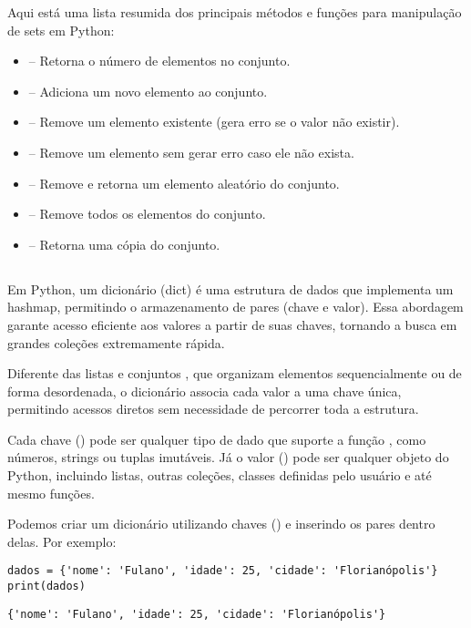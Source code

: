 Aqui está uma lista resumida dos principais métodos e funções para manipulação de sets em Python:
\begin{itemize}
\item {} – Retorna o número de elementos no conjunto.
\item {} – Adiciona um novo elemento ao conjunto.
\item {} – Remove um elemento existente (gera erro se o valor não existir).
\item {} – Remove um elemento sem gerar erro caso ele não exista.
\item {} – Remove e retorna um elemento aleatório do conjunto.
\item {} – Remove todos os elementos do conjunto.
\item {} – Retorna uma cópia do conjunto.
\end{itemize}


\subsection{}

Em Python, um dicionário (dict) é uma estrutura de dados que implementa um hashmap, permitindo o armazenamento de pares
 (chave e valor).
Essa abordagem garante acesso eficiente aos valores a partir de suas chaves, tornando a busca em grandes coleções
extremamente rápida.

Diferente das listas  e conjuntos , que organizam elementos sequencialmente ou de forma desordenada,
o dicionário associa cada valor a uma chave única, permitindo acessos diretos sem necessidade de percorrer toda a
estrutura.

Cada chave () pode ser qualquer tipo de dado que suporte a função , como números, strings
ou tuplas imutáveis.
Já o valor () pode ser qualquer objeto do Python, incluindo listas, outras coleções, classes definidas
pelo usuário e até mesmo funções.

Podemos criar um dicionário utilizando chaves (\inlcode{\{\}}) e inserindo os pares  dentro delas.
Por exemplo:
\begin{verbatim}
dados = {'nome': 'Fulano', 'idade': 25, 'cidade': 'Florianópolis'}
print(dados)
\end{verbatim}
\begin{verbatim}
{'nome': 'Fulano', 'idade': 25, 'cidade': 'Florianópolis'}
\end{verbatim}

